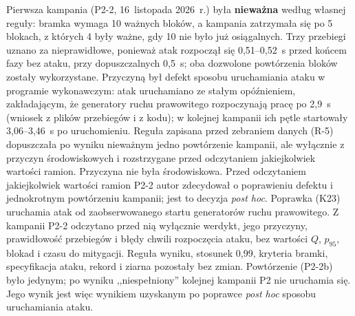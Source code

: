 \documentclass[a4paper,12pt]{article}
\begin{document}
Pierwsza kampania (P2-2, 16~listopada 2026~r.) była \textbf{nieważna} według własnej reguły: bramka wymaga 10 ważnych bloków, a kampania zatrzymała się po 5 blokach, z których 4 były ważne, gdy 10 nie było już osiągalnych. Trzy przebiegi uznano za nieprawidłowe, ponieważ atak rozpoczął się 0,51--0,52~s przed końcem fazy bez ataku, przy dopuszczalnych 0,5~s; oba dozwolone powtórzenia bloków zostały wykorzystane. Przyczyną był defekt sposobu uruchamiania ataku w programie wykonawczym: atak uruchamiano ze stałym opóźnieniem, zakładającym, że generatory ruchu prawowitego rozpoczynają pracę po 2,9~s (wniosek z plików przebiegów i z kodu); w kolejnej kampanii ich pętle startowały 3,06--3,46~s po uruchomieniu. Reguła zapisana przed zebraniem danych (R-5) dopuszczała po wyniku nieważnym jedno powtórzenie kampanii, ale wyłącznie z przyczyn środowiskowych i rozstrzygane przed odczytaniem jakiejkolwiek wartości ramion. Przyczyna nie była środowiskowa. Przed odczytaniem jakiejkolwiek wartości ramion P2-2 autor zdecydował o poprawieniu defektu i jednokrotnym powtórzeniu kampanii; jest to decyzja \textit{post hoc}. Poprawka (K23) uruchamia atak od zaobserwowanego startu generatorów ruchu prawowitego. Z kampanii P2-2 odczytano przed nią wyłącznie werdykt, jego przyczyny, prawidłowość przebiegów i błędy chwili rozpoczęcia ataku, bez wartości $Q$, $p_{95}$, blokad i czasu do mitygacji. Reguła wyniku, stosunek 0,99, kryteria bramki, specyfikacja ataku, rekord i ziarna pozostały bez zmian. Powtórzenie (P2-2b) było jedynym; po wyniku ,,niespełniony'' kolejnej kampanii P2 nie uruchamia się. Jego wynik jest więc wynikiem uzyskanym po poprawce \textit{post hoc} sposobu uruchamiania ataku.
\end{document}
